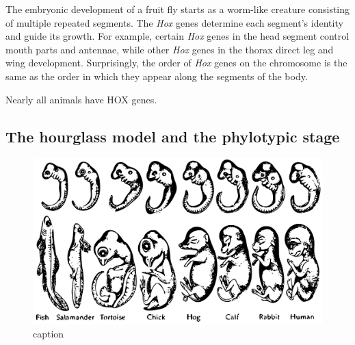 The embryonic development of a fruit fly starts as a worm-like creature consisting of multiple repeated segments. The \textit{Hox} genes determine each segment's identity and guide its growth. For example, certain \textit{Hox} genes in the head segment control mouth parts and antennae, while other \textit{Hox} genes in the thorax direct leg and wing development. Surprisingly, the order of \textit{Hox} genes on the chromosome is the same as the order in which they appear along the segments of the body. 

Nearly all animals have HOX genes.
  



\subsection{The hourglass model and the phylotypic stage}




\begin{figure}[H]
    \includegraphics[width=\linewidth]{ch.introduction/imgs/haeckel.png}
    \caption{caption}
    \label{fig:haeckel}
\end{figure}

